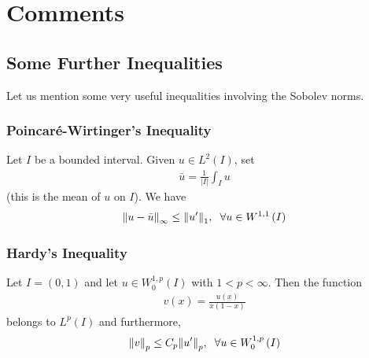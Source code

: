 \documentclass[a4paper,oneside]{article}
\numberwithin{equation}{section}
\begin{document}
\section{Comments}
\subsection{Some Further Inequalities}
Let us mention some very useful inequalities involving the Sobolev norms.
\subsubsection{Poincar\'{e}-Wirtinger's Inequality}
Let $I$ be a bounded interval. Given $u\in L^2\left(I\right)$, set 
\begin{align}
\bar u = \frac{1}{{\left| I \right|}}\int_I u 
\end{align}
(this is the mean of $u$ on $I$). We have
\begin{align}
{\left\| {u - \bar u} \right\|_\infty } \le {\left\| {u'} \right\|_1},\hspace{0.2cm}\forall u \in {W^{1,1}}\left( I \right)
\end{align}
\subsubsection{Hardy's Inequality}
Let $I=\left(0,1\right)$ and let $u\in W_0^{1,p}\left(I\right)$ with $1<p<\infty$. Then the function
\begin{align}
v\left( x \right) = \frac{{u\left( x \right)}}{{x\left( {1 - x} \right)}}
\end{align}
belongs to $L^p\left(I\right)$ and furthermore,
\begin{align}
{\left\| v \right\|_p} \le {C_p}{\left\| {u'} \right\|_p},\hspace{0.2cm} \forall u \in W_0^{1,p}\left( I \right)
\end{align}
\end{document}
